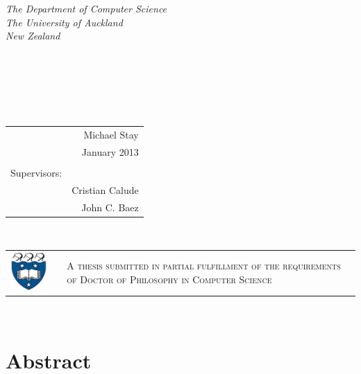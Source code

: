 \documentclass[12pt,twoside,openright]{report}
\begin{document}
  \thispagestyle{empty}
  \begin{center}
    {\em The Department of Computer Science \\ The University of Auckland \\ New Zealand \\[240pt]}
    \\
    \\~\\
    \\
  \end{center}
  {\hfill \em \fontsize{16}{16}\selectfont
    \begin{tabular}{rr}
      & Michael Stay \\
      & January 2013 \\ & \\
      Supervisors: & \\
      & Cristian Calude\\
      & John C. Baez \\
    \end{tabular}
  }\\
  \begin{tabular}{cp{50pt}p{300pt}}
    \includegraphics[width=75pt]{shield.eps} & &
    \vspace{-50pt} \textsc{\fontsize{16}{16}\selectfont A thesis submitted in partial fulfillment of the requirements of Doctor of Philosophy in Computer Science}
  \end{tabular}\\
  \pagebreak
  
\renewcommand{\thepage}{\roman{page}}
  \chapter*{Abstract}
\end{document}
